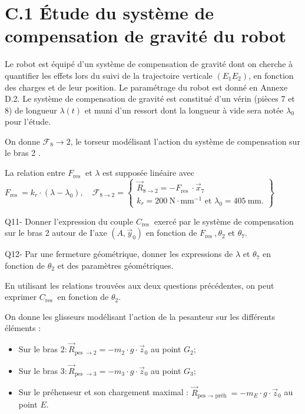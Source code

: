 \documentclass[10pt]{article}
\begin{document}
\section*{C.1 Étude du système de compensation de gravité du robot}
Le robot est équipé d'un système de compensation de gravité dont on cherche à quantifier les effets lors du suivi de la trajectoire verticale $\left(E_{1} E_{2}\right)$, en fonction des charges et de leur position. Le paramétrage du robot est donné en Annexe D.2. Le système de compensation de gravité est constitué d'un vérin (pièces 7 et 8) de longueur $\lambda(t)$ et muni d'un ressort dont la longueur à vide sera notée $\lambda_{0}$ pour l'étude.

On donne $\mathscr{F}_{8} \rightarrow 2$, le torseur modélisant l'action du système de compensation sur le bras 2 .

La relation entre $F_{\text {res }}$ et $\lambda$ est supposée linéaire avec $F_{\text {res }}=k_{r} \cdot\left(\lambda-\lambda_{0}\right), \quad \mathscr{F}_{8 \rightarrow 2}=\left\{\begin{array}{c}\vec{R}_{8 \rightarrow 2}=-F_{\text {res }} \cdot \vec{x}_{7} \\ k_{r}=200 \mathrm{~N} \cdot \mathrm{mm}^{-1} \text { et } \lambda_{0}=405 \mathrm{~mm} .\end{array}\right\}$

Q11- Donner l'expression du couple $C_{\text {res }}$ exercé par le système de compensation sur le bras 2 autour de I'axe $\left(A, \vec{y}_{0}\right)$ en fonction de $F_{\text {res }}, \theta_{2}$ et $\theta_{7}$.

Q12- Par une fermeture géométrique, donner les expressions de $\lambda$ et $\theta_{7}$ en fonction de $\theta_{2}$ et des paramètres géométriques.

En utilisant les relations trouvées aux deux questions précédentes, on peut exprimer $C_{\text {res }}$ en fonction de $\theta_{2}$.

On donne les glisseurs modélisant l'action de la pesanteur sur les différents éléments :

\begin{itemize}
  \item Sur le bras $2: \vec{R}_{\text {pes } \rightarrow 2}=-m_{2} \cdot g \cdot \vec{z}_{0}$ au point $G_{2}$;

  \item Sur le bras $3: \vec{R}_{\text {pes } \rightarrow 3}=-m_{3} \cdot g \cdot \vec{z}_{0}$ au point $G_{3}$;

  \item Sur le préhenseur et son chargement maximal : $\vec{R}_{\text {pes } \rightarrow \text { préh }}=-m_{E} \cdot g \cdot \vec{z}_{0}$ au point $E$.

\end{itemize}
\end{document}
